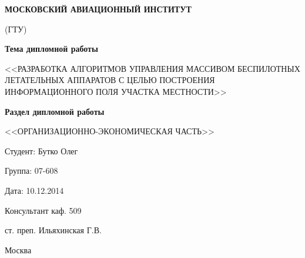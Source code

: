 \begin{titlepage}
\newpage

\begin{center}

    \textbf{МОСКОВСКИЙ АВИАЦИОННЫЙ ИНСТИТУТ}

    (ГТУ)

\end{center}

\vspace{\fill}

\begin{center}

    \textbf{Тема дипломной работы}

    <<РАЗРАБОТКА АЛГОРИТМОВ УПРАВЛЕНИЯ МАССИВОМ БЕСПИЛОТНЫХ
    ЛЕТАТЕЛЬНЫХ АППАРАТОВ С ЦЕЛЬЮ ПОСТРОЕНИЯ ИНФОРМАЦИОННОГО
    ПОЛЯ УЧАСТКА МЕСТНОСТИ>>

    \vspace{0.5em}

    \textbf{Раздел дипломной работы}

    <<ОРГАНИЗАЦИОННО-ЭКОНОМИЧЕСКАЯ ЧАСТЬ>>

\end{center}

\vspace{\fill}

\begin{flushright}
    Студент: Бутко Олег

    Группа: 07-608

    Дата: 10.12.2014

    Консультант каф. 509

    ст. преп. Ильяхинская Г.В.

\end{flushright}

\vspace{\fill}

\begin{center}
    Москва
\end{center}

\end{titlepage}
